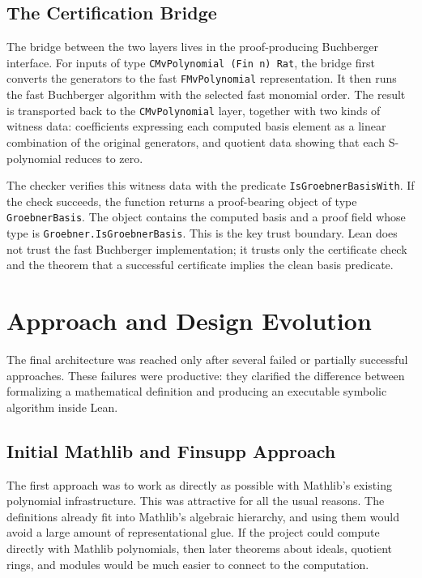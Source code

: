 \documentclass[acmsmall,nonacm,screen]{acmart}
\begin{document}
\subsection{The Certification Bridge}

The bridge between the two layers lives in the proof-producing Buchberger interface.
For inputs of type \texttt{CMvPolynomial (Fin n) Rat}, the bridge first converts the generators to
the fast \texttt{FMvPolynomial} representation.
It then runs the fast Buchberger algorithm with the selected fast monomial order.
The result is transported back to the \texttt{CMvPolynomial} layer, together with two kinds of
witness data: coefficients expressing each computed basis element as a linear combination of the
original generators, and quotient data showing that each S-polynomial reduces to zero.

The checker verifies this witness data with the predicate \texttt{IsGroebnerBasisWith}.
If the check succeeds, the function returns a proof-bearing object of type \texttt{GroebnerBasis}.
The object contains the computed basis and a proof field whose type is
\texttt{Groebner.IsGroebnerBasis}.
This is the key trust boundary.
Lean does not trust the fast Buchberger implementation; it trusts only the certificate check and
the theorem that a successful certificate implies the clean \Groebner{} basis predicate.

\section{Approach and Design Evolution}

The final architecture was reached only after several failed or partially successful approaches.
These failures were productive: they clarified the difference between formalizing a mathematical
definition and producing an executable symbolic algorithm inside Lean.

\subsection{Initial Mathlib and Finsupp Approach}

The first approach was to work as directly as possible with Mathlib's existing polynomial
infrastructure.
This was attractive for all the usual reasons.
The definitions already fit into Mathlib's algebraic hierarchy, and using them would avoid a large
amount of representational glue.
If the project could compute directly with Mathlib polynomials, then later theorems about ideals,
quotient rings, and modules would be much easier to connect to the computation.
\end{document}
